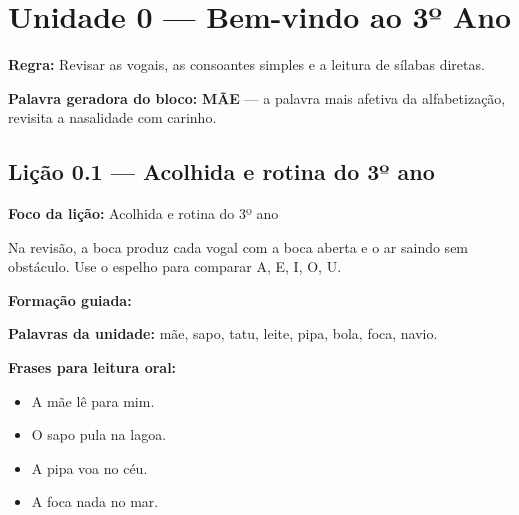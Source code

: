 

\chapter{Unidade 0 --- Bem-vindo ao 3º Ano}


\textbf{Regra:} Revisar as vogais, as consoantes simples e a leitura de sílabas diretas.

\textbf{Palavra geradora do bloco:} \textbf{MÃE} --- a palavra mais afetiva da alfabetização, revisita a nasalidade com carinho.

\section{Lição 0.1 --- Acolhida e rotina do 3º ano}

\textbf{Foco da lição:} Acolhida e rotina do 3º ano


\begin{boquinha}
Na revisão, a boca produz cada vogal com a boca aberta e o ar saindo sem obstáculo. Use o espelho para comparar A, E, I, O, U.
\end{boquinha}

\noindent\textbf{Formação guiada:}

\begin{center}
\end{center}

\noindent\textbf{Palavras da unidade:} mãe, sapo, tatu, leite, pipa, bola, foca, navio.

\noindent\textbf{Frases para leitura oral:}
\begin{itemize}[leftmargin=1.6em]
  \item A mãe lê para mim.
  \item O sapo pula na lagoa.
  \item A pipa voa no céu.
  \item A foca nada no mar.
\end{itemize}

